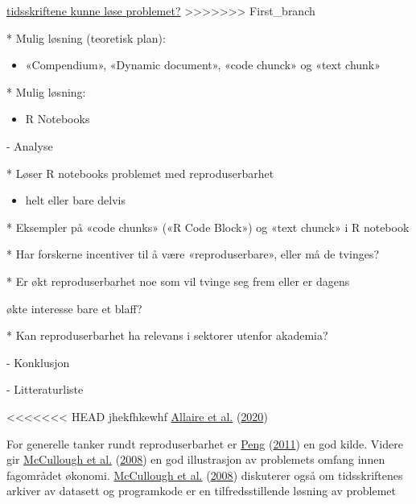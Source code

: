 \documentclass[
  12pt,
  norsk,
]{article}
\providecommand{\tightlist}{%
  \setlength{\itemsep}{0pt}\setlength{\parskip}{0pt}}
\begin{document}
\underline{tidsskriftene kunne løse problemet?}
\textgreater\textgreater\textgreater\textgreater\textgreater\textgreater\textgreater{}
First\_branch

* Mulig løsning (teoretisk plan):

\begin{itemize}
\tightlist
\item
  «Compendium», «Dynamic document», «code chunck» og «text chunk»
\end{itemize}

* Mulig løsning:

\begin{itemize}
\tightlist
\item
  R Notebooks
\end{itemize}

- Analyse

* Løser R notebooks problemet med reproduserbarhet

\begin{itemize}
\tightlist
\item
  helt eller bare delvis
\end{itemize}

* Eksempler på «code chunks» («R Code Block») og «text chunck» i R
notebook

* Har forskerne incentiver til å være «reproduserbare», eller må de
tvinges?

* Er økt reproduserbarhet noe som vil tvinge seg frem eller er dagens

økte interesse bare et blaff?

* Kan reproduserbarhet ha relevans i sektorer utenfor akademia?

- Konklusjon

- Litteraturliste

\textless\textless\textless\textless\textless\textless\textless{} HEAD
jhekfhkewhf \protect\hyperlink{ref-allaire2020}{Allaire et al.}
(\protect\hyperlink{ref-allaire2020}{2020})

For generelle tanker rundt reproduserbarhet er
\protect\hyperlink{ref-peng2011}{Peng}
(\protect\hyperlink{ref-peng2011}{2011}) en god kilde. Videre gir
\protect\hyperlink{ref-mccullough2008}{McCullough et al.}
(\protect\hyperlink{ref-mccullough2008}{2008}) en god illustrasjon av
problemets omfang innen fagområdet økonomi.
\protect\hyperlink{ref-mccullough2008}{McCullough et al.}
(\protect\hyperlink{ref-mccullough2008}{2008}) diskuterer også om
tidsskriftenes arkiver av datasett og programkode er en
tilfredsstillende løsning av problemet
\end{document}
